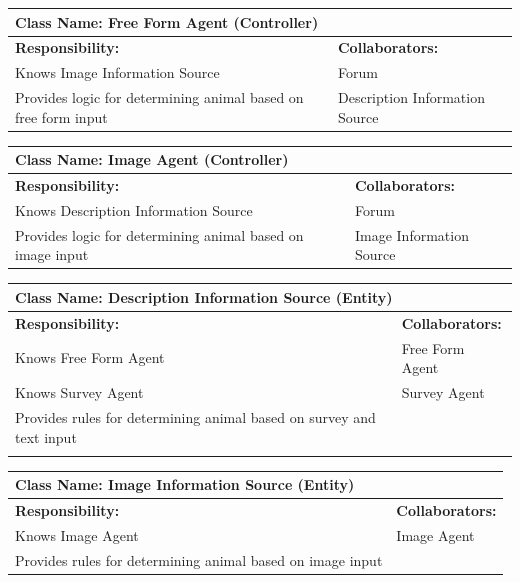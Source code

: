 \documentclass[]{article}
\begin{document}
    	\begin{table}[H]
		\centering
		\begin{tabular}{|p{7cm}|p{7cm}|}
		\hline 
		 \multicolumn{2}{|l|}{\textbf{Class Name: Free Form Agent (Controller)}} \\
		\hline
		\textbf{Responsibility:} & \textbf{Collaborators:} \\
		\hline
		Knows Image Information Source & Forum \\
        Provides logic for determining animal based on free form input & Description Information Source \\

		\hline
		\end{tabular}
	\end{table}


    	\begin{table}[H]
		\centering
		\begin{tabular}{|p{7cm}|p{7cm}|}
		\hline 
		 \multicolumn{2}{|l|}{\textbf{Class Name: Image Agent (Controller)}} \\
		\hline
		\textbf{Responsibility:} & \textbf{Collaborators:} \\
		\hline
		Knows Description Information Source  &  Forum		\\
        Provides logic for determining animal based on image input & Image Information Source \\
		\hline
		\end{tabular}
	\end{table}

	\begin{table}[H]
		\centering
		\begin{tabular}{|p{7cm}|p{7cm}|}
		\hline 
		 \multicolumn{2}{|l|}{\textbf{Class Name: Description Information Source (Entity)}} \\
		\hline
		\textbf{Responsibility:} & \textbf{Collaborators:} \\
		\hline
		Knows Free Form Agent & Free Form Agent \\
        Knows Survey Agent& Survey Agent \\
		Provides rules for determining animal based on survey and text input & \\
		\\

		\hline
		\end{tabular}
	\end{table}


    	\begin{table}[H]
		\centering
		\begin{tabular}{|p{7cm}|p{7cm}|}
		\hline 
		 \multicolumn{2}{|l|}{\textbf{Class Name: Image Information Source (Entity)}} \\
		\hline
		\textbf{Responsibility:} & \textbf{Collaborators:} \\
		\hline
		Knows Image Agent  &  Image Agent\\
        Provides rules for determining animal based on image input & \\
		\hline
		\end{tabular}
	\end{table}
	
\end{document}
